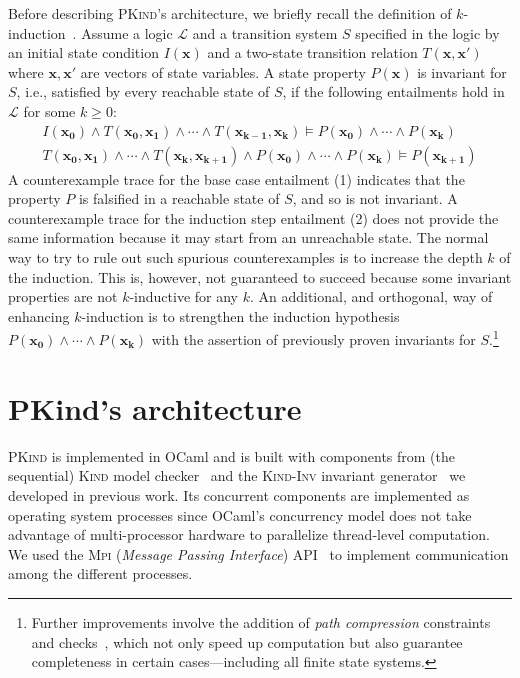 \documentclass[submission,copyright,creativecommons]{eptcs}
\newcommand{\Kind}{\textrm{\textsc{Kind}}\xspace}
\newcommand{\KindInv}{\textrm{\textsc{Kind}-\textsc{Inv}}\xspace}
\newcommand{\PKind}{\textrm{\textsc{PKind}}\xspace}
\newcommand{\Mpi}{\textrm{\textsc{Mpi}}\xspace}
\renewcommand{\vec}[1]{\mathbf{#1}}
\newcommand{\lo}{\ensuremath{\mathcal{L}}\xspace}
\begin{document}
Before describing \PKind's architecture, 
we briefly recall the definition of $k$-induction~\cite{She00}.
Assume a logic $\lo$ and a transition system $S$ specified in the logic
by an initial state condition $I(\vec x)$ and a two-state transition 
relation $T(\vec x,\vec x')$
where $\vec x, \vec x'$ are vectors of state variables.
A state property $P(\vec x)$ is invariant for $S$,
i.e., satisfied by every reachable state of $S$,
if the following entailments hold in $\lo$ for some $k \geq 0$:
\begin{gather}
I(\vec{x_0}) \land  T(\vec{x_0},\vec{x_{1}}) \land \cdots \land T(\vec{x_{k-1}},\vec{x_k}) \models P(\vec{x_0}) \land \cdots \land P(\vec{x_k}) 
\label{eq:base} 
 \\ 
 T(\vec{x_0},\vec{x_{1}}) \land \cdots \land T(\vec{x_k},\vec{x_{k+1}}) \land P(\vec{x_0}) \land \cdots \land P(\vec{x_k}) \models P(\vec{x_{k+1}})
 \label{eq:step} 
\end{gather}
A counterexample trace for the base case entailment (1) indicates that 
the property 
$P$ 
is falsified in a reachable state of $S$, 
and so is not invariant. 
A counterexample trace for the induction step entailment (2) does not
provide the same information because it may start from an unreachable state.  
The normal way to try to rule out such spurious counterexamples is 
to increase the depth $k$ of the induction.  This is, however, 
not guaranteed to succeed because some invariant properties are not
$k$-inductive for any $k$.  
An additional, and orthogonal, way of enhancing $k$-induction is 
to strengthen the induction hypothesis 
$P(\vec{x_0}) \land \cdots \land P(\vec{x_k})$
with the assertion of previously proven invariants for $S$.\footnote{
Further improvements involve the addition of \emph{path compression}
constraints and checks~\cite{She00,deMRS-CAV-03},
which not only speed up computation 
but also guarantee completeness in certain cases---including all finite state systems.
}


\section{PKind's architecture}
 
\PKind is implemented in OCaml and is built with components from
(the sequential) \Kind model checker~\cite{hagen08} and the \KindInv invariant
generator~\cite{Kahsai-Ge-Tinelli-10} we developed in previous work.
Its concurrent components are implemented as operating system
processes since OCaml's concurrency model 
does not take advantage of multi-processor hardware to parallelize 
thread-level computation.  
We used the \Mpi
(\textit{Message Passing Interface}) API~\cite{mpi97} to implement
communication among the different processes.
\end{document}

